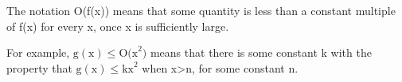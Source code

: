 The notation O(f(x)) means that some quantity is less than a constant multiple
of f(x) for every x, once x is sufficiently large.
\par
For example, $ \mathrm{g(x)} \leq \mathrm{O(x}^2 ) $ means that there
is some constant k with the property that $ \mathrm{g(x)} \leq \mathrm{kx}^2 $ when
x>n, for some constant n.